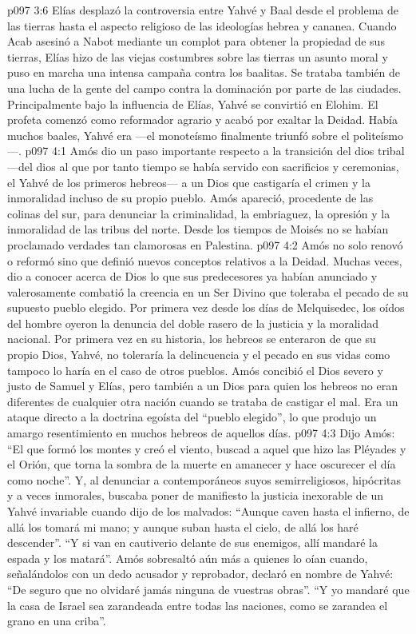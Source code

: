 \vs p097 3:6 Elías desplazó la controversia entre Yahvé y Baal desde el problema de las tierras hasta el aspecto religioso de las ideologías hebrea y cananea. Cuando Acab asesinó a Nabot mediante un complot para obtener la propiedad de sus tierras, Elías hizo de las viejas costumbres sobre las tierras un asunto moral y puso en marcha una intensa campaña contra los baalitas. Se trataba también de una lucha de la gente del campo contra la dominación por parte de las ciudades. Principalmente bajo la influencia de Elías, Yahvé se convirtió en Elohim. El profeta comenzó como reformador agrario y acabó por exaltar la Deidad. Había muchos baales, Yahvé era  ---el monoteísmo finalmente triunfó sobre el politeísmo---.
\vs p097 4:1 Amós dio un paso importante respecto a la transición del dios tribal ---del dios al que por tanto tiempo se había servido con sacrificios y ceremonias, el Yahvé de los primeros hebreos--- a un Dios que castigaría el crimen y la inmoralidad incluso de su propio pueblo. Amós apareció, procedente de las colinas del sur, para denunciar la criminalidad, la embriaguez, la opresión y la inmoralidad de las tribus del norte. Desde los tiempos de Moisés no se habían proclamado verdades tan clamorosas en Palestina.
\vs p097 4:2 Amós no solo renovó o reformó sino que definió nuevos conceptos relativos a la Deidad. Muchas veces, dio a conocer acerca de Dios lo que sus predecesores ya habían anunciado y valerosamente combatió la creencia en un Ser Divino que toleraba el pecado de su supuesto pueblo elegido. Por primera vez desde los días de Melquisedec, los oídos del hombre oyeron la denuncia del doble rasero de la justicia y la moralidad nacional. Por primera vez en su historia, los hebreos se enteraron de que su propio Dios, Yahvé, no toleraría la delincuencia y el pecado en sus vidas como tampoco lo haría en el caso de otros pueblos. Amós concibió el Dios severo y justo de Samuel y Elías, pero también a un Dios para quien los hebreos no eran diferentes de cualquier otra nación cuando se trataba de castigar el mal. Era un ataque directo a la doctrina egoísta del “pueblo elegido”, lo que produjo un amargo resentimiento en muchos hebreos de aquellos días.
\vs p097 4:3 Dijo Amós: “El que formó los montes y creó el viento, buscad a aquel que hizo las Pléyades y el Orión, que torna la sombra de la muerte en amanecer y hace oscurecer el día como noche”. Y, al denunciar a contemporáneos suyos semirreligiosos, hipócritas y a veces inmorales, buscaba poner de manifiesto la justicia inexorable de un Yahvé invariable cuando dijo de los malvados: “Aunque caven hasta el infierno, de allá los tomará mi mano; y aunque suban hasta el cielo, de allá los haré descender”. “Y si van en cautiverio delante de sus enemigos, allí mandaré la espada y los matará”. Amós sobresaltó aún más a quienes lo oían cuando, señalándolos con un dedo acusador y reprobador, declaró en nombre de Yahvé: “De seguro que no olvidaré jamás ninguna de vuestras obras”. “Y yo mandaré que la casa de Israel sea zarandeada entre todas las naciones, como se zarandea el grano en una criba”.
